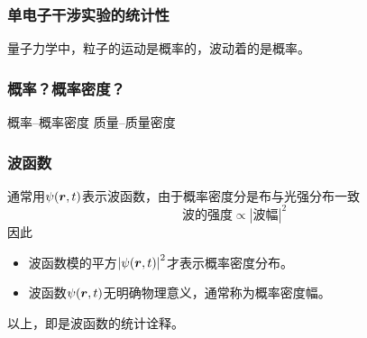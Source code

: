 \begin{frame}
    \frametitle{单电子干涉实验的统计性}
    \begin{center}
        量子力学中，粒子的运动是概率的，波动着的是概率。
    \end{center}
\end{frame}

\begin{frame}
    \frametitle{概率？概率密度？}
    \begin{center}
        概率--概率密度\qquad
        质量--质量密度
    \end{center}
\end{frame}

\begin{frame}
    \frametitle{波函数}
    通常用$\psi(\vb*{r},t)$表示波函数，由于概率密度分是布与光强分布一致
    \begin{equation}
        \text{波的强度}\propto|\text{波幅}|^2
    \end{equation}
    因此
    \begin{itemize}
        \item 波函数模的平方$\abs{\psi(\vb*{r},t)}^2$才表示概率密度分布。
        \item 波函数$\psi(\vb*{r},t)$无明确物理意义，通常称为概率密度幅。
    \end{itemize}
    以上，即是波函数的统计诠释。
\end{frame}